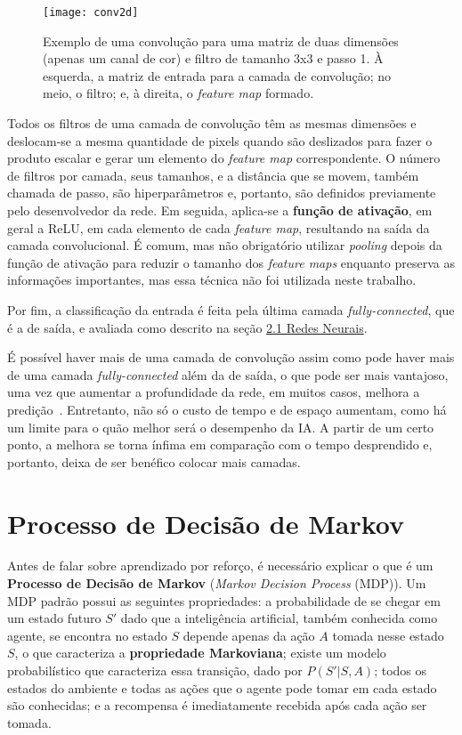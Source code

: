\begin{figure}[h!]
\texttt{[image: conv2d]}
\centering
\caption{Exemplo de uma convolução para uma matriz de duas dimensões (apenas um canal de cor) e filtro de tamanho 3x3 e passo 1. À esquerda, a matriz de entrada para a camada de convolução; no meio, o filtro; e, à direita, o \textit{feature map} formado.}
\label{fig:conv2d}
\end{figure}

Todos os filtros de uma camada de convolução têm as mesmas dimensões e deslocam-se a mesma quantidade de pixels quando são deslizados para fazer o produto escalar e gerar um elemento do \textit{feature map} correspondente.
O número de filtros por camada, seus tamanhos, e a distância que se movem, também chamada de passo, são hiperparâmetros e, portanto, são definidos previamente pelo desenvolvedor da rede.
Em seguida, aplica-se a \textbf{função de ativação}, em geral a ReLU, em cada elemento de cada \textit{feature map}, resultando na saída da camada convolucional.
É comum, mas não obrigatório utilizar \textit{pooling} depois da função de ativação para reduzir o tamanho dos \textit{feature maps} enquanto preserva as informações importantes, mas essa técnica não foi utilizada neste trabalho.

Por fim, a classificação da entrada é feita pela última camada \textit{fully-connected}, que é a de saída, e avaliada como descrito na seção \hyperref[sec:nn]{2.1 Redes Neurais}.

É possível haver mais de uma camada de convolução assim como pode haver mais de uma camada \textit{fully-connected} além da de saída, o que pode ser mais vantajoso, uma vez que aumentar a profundidade da rede, em muitos casos, melhora a predição~\cite{Goodfellow-et-al-2016}.
Entretanto, não só o custo de tempo e de espaço aumentam, como há um limite para o quão melhor será o desempenho da IA.
A partir de um certo ponto, a melhora se torna ínfima em comparação com o tempo desprendido e, portanto, deixa de ser benéfico colocar mais camadas.


\section{Processo de Decisão de Markov}
\label{sec:mdp}

Antes de falar sobre aprendizado por reforço, é necessário explicar o que é um \textbf{Processo de Decisão de Markov} (\textit{Markov Decision Process} (MDP)).
Um MDP padrão possui as seguintes propriedades:
a probabilidade de se chegar em um estado futuro $S'$ dado que a inteligência artificial, também conhecida como agente, se encontra no estado $S$ depende apenas da ação $A$ tomada nesse estado $S$, o que caracteriza a \textbf{propriedade Markoviana};
existe um modelo probabilístico que caracteriza essa transição, dado por $P(S'|S,A)$;
todos os estados do ambiente e todas as ações que o agente pode tomar em cada estado são conhecidas;
e a recompensa é imediatamente recebida após cada ação ser tomada.

